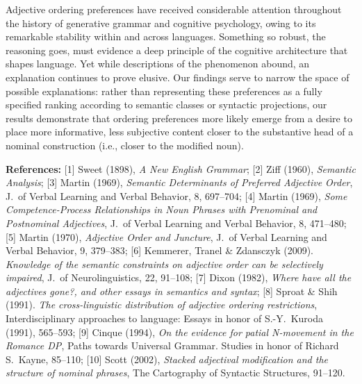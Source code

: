 \documentclass[12pt]{article}
\begin{document}
Adjective ordering preferences have received considerable attention throughout the history of generative grammar and cognitive psychology, owing to its remarkable stability within and across languages. Something so robust, the reasoning goes, must evidence a deep principle of the cognitive architecture that shapes language. Yet while descriptions of the phenomenon abound, an explanation continues to prove elusive. Our findings serve to narrow the space of possible explanations: rather than representing these preferences as a fully specified ranking according to semantic classes or syntactic projections, our results demonstrate that ordering preferences more likely emerge from a desire to place more informative, less subjective content closer to the substantive head of a nominal construction (i.e., closer to the modified noun).

\vspace{10pt}
\noindent
\footnotesize
	\textbf{References:} 
	[1]  Sweet (1898), {\em A New English Grammar};
	[2]  Ziff (1960), {\em Semantic Analysis};
	[3]  Martin (1969), {\em Semantic Determinants of Preferred Adjective Order}, J.~of Verbal Learning and Verbal Behavior, 8, 697--704;
	[4]  Martin (1969), {\em Some Competence-Process Relationships in Noun Phrases with Prenominal and Postnominal Adjectives}, J.~of Verbal Learning and Verbal Behavior, 8, 471--480;
	[5]  Martin (1970), {\em Adjective Order and Juncture}, J.~of Verbal Learning and Verbal Behavior, 9, 379--383;
	[6] Kemmerer, Tranel \& Zdansczyk (2009). {\em Knowledge of the semantic constraints on adjective order can be selectively impaired}, J.~of Neurolinguistics, 22, 91--108;
	[7]  Dixon (1982), {\em Where have all the adjectives gone?, and other essays in semantics and syntax};
	[8]  Sproat \& Shih (1991). {\em The cross-linguistic distribution of adjective ordering restrictions}, Interdisciplinary approaches to language: Essays in honor of S.-Y.~Kuroda (1991), 565--593;
	[9]  Cinque (1994), {\em On the evidence for patial N-movement in the Romance DP}, Paths towards Universal Grammar. Studies in honor of Richard S.~Kayne, 85--110;
	[10]  Scott (2002), {\em Stacked adjectival modification and the structure of nominal phrases}, The Cartography of Syntactic Structures, 91--120.
	
	
\newpage
\end{document}

